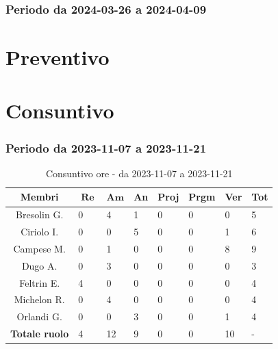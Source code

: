\documentclass[10pt, a4paper]{article}
\begin{document}
{{{{{{{\subsubsection{Periodo da 2024-03-26 a 2024-04-09}



\section{Preventivo}





\section{Consuntivo}


\subsubsection{Periodo da 2023-11-07 a 2023-11-21}


\begin{table}[H]
\begin{tabularx}{\textwidth}{c|X|X|X|X|X|X|X}
        \textbf{Membri} & $\operatorname{\textbf{Re}}$ & $\mathrm{\textbf{Am}}$ & \textbf{An} & \textbf{Proj} & \textbf{Prgm} & \textbf{Ver} & \textbf{Tot} \\
        \hline Bresolin G. & 0& 4 & 1 & 0 & 0 & 0 & 5 \\
        \hline Ciriolo I. & 0 & 0 & 5 & 0 & 0 & 1 & 6 \\
        \hline Campese M. & 0 & 1 & 0 & 0 & 0 & 8 & 9 \\
        \hline Dugo A. & 0 & 3 & 0 & 0 & 0 & 0 & 3 \\
        \hline Feltrin E. & 4 & 0 & 0 & 0 & 0 & 0 & 4 \\
        \hline Michelon R. & 0 & 4 & 0 & 0 & 0 & 0 & 4 \\
        \hline Orlandi G. & 0 & 0 & 3 & 0 & 0 & 1 & 4 \\
        \hline
        \textbf{Totale ruolo} & 4 & 12 & 9 & 0 & 0 & 10 & - 
    \end{tabularx}
    \caption{Consuntivo ore - da 2023-11-07 a 2023-11-21}
    \end{table}
    






}}}}}}}
\end{document}
